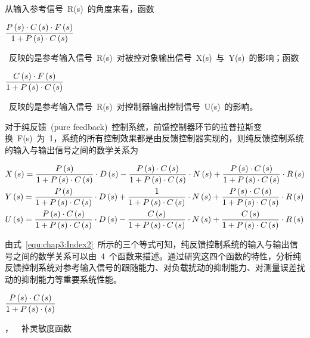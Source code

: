 从输入参考信号~R(s)~的角度来看，函数~\begin{footnotesize}$\displaystyle\frac{P\left(s\right)\cdot C\left(s\right)\cdot F\left(s\right)}{1+P\left(s\right)\cdot C\left(s\right)}$\end{footnotesize}~反映的是参考输入信号~R(s)~对被控对象输出信号~X(s)~与~Y(s)~的影响；函数~\begin{footnotesize}$\displaystyle\frac{C\left(s\right)\cdot F\left(s\right)}{1+P\left(s\right)\cdot C\left(s\right)}$\end{footnotesize}~反映的是参考输入信号~R(s)~对控制器输出控制信号~U(s)~的影响。

对于纯反馈~(pure feedback)~控制系统，前馈控制器环节的拉普拉斯变换~F(s)~为~1，系统的所有控制效果都是由反馈控制器实现的，则纯反馈控制系统的输入与输出信号之间的数学关系为

\begin{footnotesize}
\begin{equation}\label{equ:chap3:Index2}
\begin{aligned}
   &   X\left(s\right)=\displaystyle\frac{P\left(s\right)}{1+P\left(s\right)\cdot C\left(s\right)}\cdot D\left(s\right)-\displaystyle\frac{P\left(s\right)\cdot C\left(s\right) }{1+P\left(s\right)\cdot C\left(s\right)}\cdot N\left(s\right)+\displaystyle\frac{P\left(s\right)\cdot C\left(s\right) }{1+P\left(s\right)\cdot C\left(s\right)}\cdot R\left(s\right) \\
   &   Y\left(s\right)=\displaystyle\frac{P\left(s\right)}{1+P\left(s\right)\cdot C\left(s\right)}\cdot D\left(s\right)+\displaystyle\frac{1}{1+P\left(s\right)\cdot C\left(s\right)}\cdot N\left(s\right)+\displaystyle\frac{P\left(s\right)\cdot C\left(s\right)}{1+P\left(s\right)\cdot C\left(s\right)}\cdot R\left(s\right) \\
   &   U\left(s\right)=\displaystyle\frac{P\left(s\right)\cdot C\left(s\right)}{1+P\left(s\right)\cdot C\left(s\right)}\cdot D\left(s\right)-\displaystyle\frac{C\left(s\right)}{1+P\left(s\right)\cdot C\left(s\right)}\cdot N\left(s\right)+\displaystyle\frac{C\left(s\right)}{1+P\left(s\right)\cdot C\left(s\right)}\cdot R\left(s\right) \\
\end{aligned}
\end{equation}
\end{footnotesize}

由式~\ref{equ:chap3:Index2}~所示的三个等式可知，纯反馈控制系统的输入与输出信号之间的数学关系可以由~4~个函数来描述。通过研究这四个函数的特性，分析纯反馈控制系统对参考输入信号的跟随能力、对负载扰动的抑制能力、对测量误差扰动的抑制能力等重要系统性能。

\medskip
 \begin{small}$\displaystyle\frac{P\left(s\right)\cdot C\left(s\right)}{1+P\left(s\right)\cdot \left(s\right)}$ \end{small}，~~补灵敏度函数

